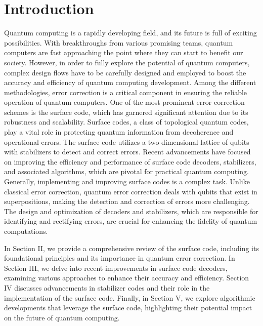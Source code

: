 \documentclass[final,5p,times,twocolumn,authoryear]{elsarticle}
\begin{document}


\section{Introduction}
\label{introduction}

Quantum computing is a rapidly developing field, and its future is full of exciting possibilities. With breakthroughs from various promising teams, quantum computers are fast approaching the point where they can start to benefit our society. However, in order to fully explore the potential of quantum computers, complex design flows have to be carefully designed and employed to boost the accuracy and efficiency of quantum computing development. Among the different methodologies, error correction is a critical component in ensuring the reliable operation of quantum computers. One of the most prominent error correction schemes is the surface code, which has garnered significant attention due to its robustness and scalability. Surface codes, a class of topological quantum codes, play a vital role in protecting quantum information from decoherence and operational errors. The surface code utilizes a two-dimensional lattice of qubits with stabilizers to detect and correct errors. Recent advancements have focused on improving the efficiency and performance of surface code decoders, stabilizers, and associated algorithms, which are pivotal for practical quantum computing. Generally, implementing and improving surface codes is a complex task. Unlike classical error correction, quantum error correction deals with qubits that exist in superpositions, making the detection and correction of errors more challenging. The design and optimization of decoders and stabilizers, which are responsible for identifying and rectifying errors, are crucial for enhancing the fidelity of quantum computations.

In Section II, we provide a comprehensive review of the surface code, including its foundational principles and its importance in quantum error correction. In Section III, we delve into recent improvements in surface code decoders, examining various approaches to enhance their accuracy and efficiency. Section IV discusses advancements in stabilizer codes and their role in the implementation of the surface code. Finally, in Section V, we explore algorithmic developments that leverage the surface code, highlighting their potential impact on the future of quantum computing.
\end{document}
